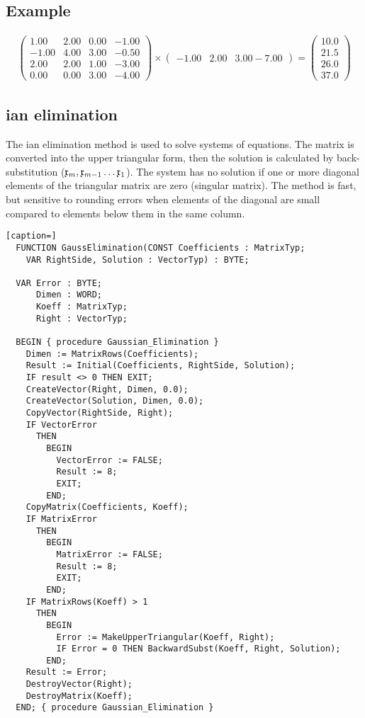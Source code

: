 \subsection{Example}
\begin{gather}
  \begin{pmatrix}
      1.00 & 2.00 & 0.00 & -1.00 \\
     -1.00 & 4.00 & 3.00 & -0.50 \\
      2.00 & 2.00 & 1.00 & -3.00 \\
      0.00 & 0.00 & 3.00 & -4.00
  \end{pmatrix} \times
  \begin{pmatrix}
     -1.00 & 2.00 & 3.00 -7.00
  \end{pmatrix} =
  \begin{pmatrix}
     10.0 \\
     21.5 \\
     26.0 \\
     37.0
  \end{pmatrix}
\end{gather}


\subsection{ian elimination}

The ian elimination method is used to solve systems of equations. The matrix is converted into the upper triangular form, then the solution is calculated by back-substitution (\( \mathfrak{x}_m, \mathfrak{x}_{m-1}\ldots \mathfrak{x}_1 \)). The system has no solution if one or more diagonal elements of the triangular matrix are zero (singular matrix). The method is fast, but sensitive to rounding errors when elements of the diagonal are small compared to elements below them in the same column.

\begin{lstlisting}[caption=]
  FUNCTION GaussElimination(CONST Coefficients : MatrixTyp;
    VAR RightSide, Solution : VectorTyp) : BYTE;

  VAR Error : BYTE;
      Dimen : WORD;
      Koeff : MatrixTyp;
      Right : VectorTyp;

  BEGIN { procedure Gaussian_Elimination }
    Dimen := MatrixRows(Coefficients);
    Result := Initial(Coefficients, RightSide, Solution);
    IF result <> 0 THEN EXIT;
    CreateVector(Right, Dimen, 0.0);
    CreateVector(Solution, Dimen, 0.0);
    CopyVector(RightSide, Right);
    IF VectorError
      THEN
        BEGIN
          VectorError := FALSE;
          Result := 8;
          EXIT;
        END;
    CopyMatrix(Coefficients, Koeff);
    IF MatrixError
      THEN
        BEGIN
          MatrixError := FALSE;
          Result := 8;
          EXIT;
        END;
    IF MatrixRows(Koeff) > 1
      THEN
        BEGIN
          Error := MakeUpperTriangular(Koeff, Right);
          IF Error = 0 THEN BackwardSubst(Koeff, Right, Solution);
        END;
    Result := Error;
    DestroyVector(Right);
    DestroyMatrix(Koeff);
  END; { procedure Gaussian_Elimination }
\end{lstlisting}

